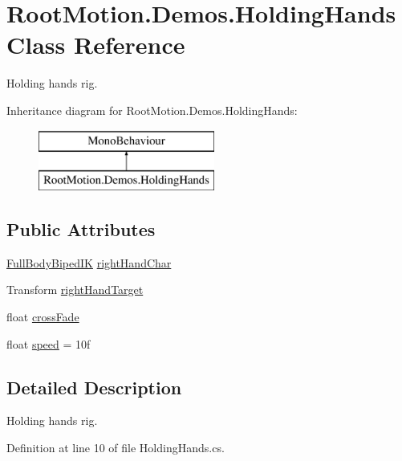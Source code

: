 \hypertarget{class_root_motion_1_1_demos_1_1_holding_hands}{}\section{Root\+Motion.\+Demos.\+Holding\+Hands Class Reference}
\label{class_root_motion_1_1_demos_1_1_holding_hands}


Holding hands rig.  


Inheritance diagram for Root\+Motion.\+Demos.\+Holding\+Hands\+:\begin{figure}[H]
\begin{center}
\leavevmode
\includegraphics[height=2.000000cm]{class_root_motion_1_1_demos_1_1_holding_hands}
\end{center}
\end{figure}
\subsection*{Public Attributes}
\begin{DoxyCompactItemize}
\item 
\mbox{\hyperlink{class_root_motion_1_1_final_i_k_1_1_full_body_biped_i_k}{Full\+Body\+Biped\+IK}} \mbox{\hyperlink{class_root_motion_1_1_demos_1_1_holding_hands_a97b4be9c1a13cbd339d53b54611c8e8e}{right\+Hand\+Char}}
\item 
Transform \mbox{\hyperlink{class_root_motion_1_1_demos_1_1_holding_hands_ab826d076b91cba0003de33bb3ddb966e}{right\+Hand\+Target}}
\item 
float \mbox{\hyperlink{class_root_motion_1_1_demos_1_1_holding_hands_abf7cac1f6136b43f4593410c4648390c}{cross\+Fade}}
\item 
float \mbox{\hyperlink{class_root_motion_1_1_demos_1_1_holding_hands_a52296d2e735ce4ac1ad7dadf4be3462a}{speed}} = 10f
\end{DoxyCompactItemize}


\subsection{Detailed Description}
Holding hands rig. 



Definition at line 10 of file Holding\+Hands.\+cs.



